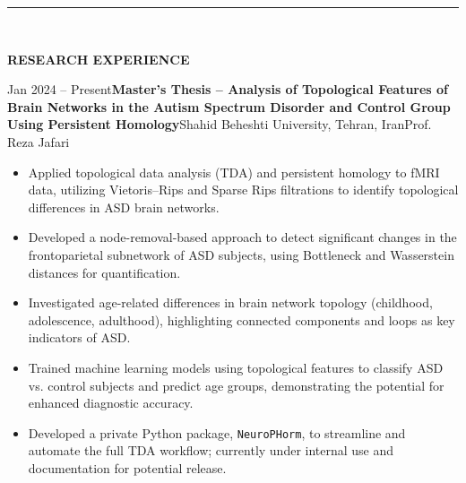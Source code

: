 \documentclass[12pt, b4paper]{cv}
\begin{document}
\vspace{-0.15in}
\rule{\textwidth}{1pt}\\
\vspace{-0.15in}

{\Large \textbf{RESEARCH EXPERIENCE}}
\vspace{0.1in}

\begin{research_exp}{Jan 2024 -- Present}{\textbf{Master’s Thesis – Analysis of Topological Features of Brain Networks in the Autism Spectrum Disorder and Control Group Using Persistent Homology}\vspace{5pt}}{Shahid Beheshti University, Tehran, Iran}{Prof. Reza Jafari}

\vspace{10pt}
\begin{itemize}
	\item Applied topological data analysis (TDA) and persistent homology to fMRI data, utilizing Vietoris–Rips and Sparse Rips filtrations to identify topological differences in ASD brain networks.

	\item Developed a node-removal-based approach to detect significant changes in the frontoparietal subnetwork of ASD subjects, using Bottleneck and Wasserstein distances for quantification.
	
	\item Investigated age-related differences in brain network topology (childhood, adolescence, adulthood), highlighting connected components and loops as key indicators of ASD.
	
	\item Trained machine learning models using topological features to classify ASD vs. control subjects and predict age groups, demonstrating the potential for enhanced diagnostic accuracy.
	
	\item Developed a private Python package, \texttt{NeuroPHorm}, to streamline and automate the full TDA workflow; currently under internal use and documentation for potential release.
\end{itemize}
\end{research_exp}
\end{document}
